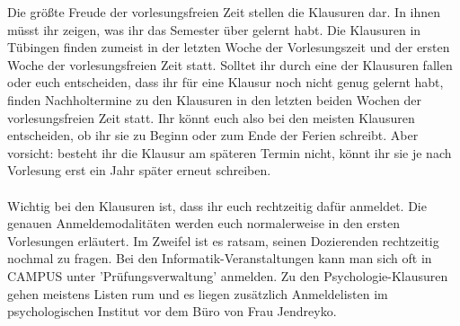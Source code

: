 Die größte Freude der vorlesungsfreien Zeit stellen die Klausuren dar. In ihnen müsst ihr zeigen, was ihr das Semester über gelernt habt. Die Klausuren in Tübingen finden zumeist in der letzten Woche der Vorlesungszeit und der ersten Woche der vorlesungsfreien Zeit statt. Solltet ihr durch eine der Klausuren fallen oder euch entscheiden, dass ihr für eine Klausur noch nicht genug gelernt habt, finden Nachholtermine zu den Klausuren in den letzten beiden Wochen der vorlesungsfreien Zeit statt. Ihr könnt euch also bei den meisten Klausuren entscheiden, ob ihr sie zu Beginn oder zum Ende der Ferien schreibt. Aber vorsicht: besteht ihr die Klausur am späteren Termin nicht, könnt ihr sie je nach Vorlesung erst ein Jahr später erneut schreiben.\\
\\
Wichtig bei den Klausuren ist, dass ihr euch rechtzeitig dafür anmeldet. Die genauen Anmeldemodalitäten werden euch normalerweise in den ersten Vorlesungen erläutert. Im Zweifel ist es ratsam, seinen Dozierenden rechtzeitig nochmal zu fragen. Bei den Informatik-Veranstaltungen kann man sich oft in CAMPUS unter 'Prüfungsverwaltung' anmelden. Zu den Psychologie-Klausuren gehen meistens Listen rum und es liegen zusätzlich Anmeldelisten im psychologischen Institut vor dem Büro von Frau Jendreyko.
